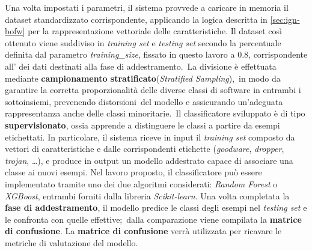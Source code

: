 Una volta impostati i parametri, il sistema provvede a caricare in memoria il dataset standardizzato corrispondente, applicando la logica descritta in \autoref{sec:ign-bofw} per la rappresentazione
vettoriale delle caratteristiche.
Il dataset così ottenuto viene suddiviso in \textit{training set} e \textit{testing set} secondo la percentuale definita dal parametro \textit{training\_size},
fissato in questo lavoro a $0.8$, corrispondente all' dei dati destinati alla fase di addestramento.\
La divisione è effettuata mediante \textbf{campionamento stratificato}(\textit{Stratified Sampling}),\
in modo da garantire la corretta proporzionalità delle diverse classi di software in entrambi i sottoinsiemi, prevenendo distorsioni\
del modello e assicurando un'adeguata rappresentanza anche delle classi minoritarie.\
Il classificatore sviluppato è di tipo \textbf{supervisionato}, ossia apprende a distinguere le classi a partire da esempi etichettati.
In particolare, il sistema riceve in input il \textit{training set} composto da vettori di caratteristiche e dalle corrispondenti etichette (\textit{goodware}, \textit{dropper},
\textit{trojan}, \dots), e produce in output un modello addestrato capace di associare una classe ai nuovi esempi.
Nel lavoro proposto, il classificatore può essere implementato tramite uno dei due algoritmi considerati: \textit{Random Forest} o \textit{XGBoost},
entrambi forniti dalla libreria \textit{Scikit-learn}\mycite{scikit-learn}.
Una volta completata la \textbf{fase di addestramento}, il modello predice le classi degli esempi nel \textit{testing set} e le confronta con quelle effettive;\
dalla comparazione viene compilata la \textbf{matrice di confusione}.
La \textbf{matrice di confusione} verrà utilizzata per ricavare le metriche di valutazione del modello.